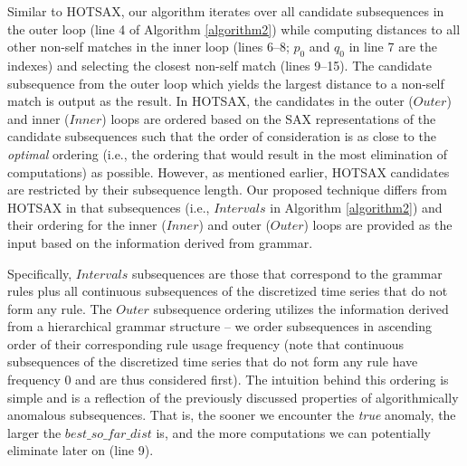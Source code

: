 \documentclass{sig-alternate}
\begin{document}
Similar to HOTSAX, our algorithm iterates over all candidate subsequences in the outer loop (line 4 of Algorithm \ref{algorithm2}) while computing distances to all other non-self matches in the inner loop (lines 6--8; $p_{0}$ and $q_{0}$ in line 7 are the indexes) and selecting the closest non-self match (lines 9--15). The candidate subsequence from the outer loop which yields the largest distance to a non-self match is output as the result. In HOTSAX, the candidates in the outer ($Outer$) and inner ($Inner$) loops are ordered based on the SAX representations of the candidate subsequences such that the order of consideration is as close to the \textit{optimal} ordering (i.e., the ordering that would result in the most elimination of computations) as possible. However, as mentioned earlier, HOTSAX candidates are restricted by their subsequence length. Our proposed technique differs from HOTSAX in that subsequences (i.e., $Intervals$ in Algorithm \ref{algorithm2}) and their ordering for the inner ($Inner$) and outer ($Outer$) loops are provided as the input based on the information derived from grammar.

Specifically, $Intervals$ subsequences are those that correspond to the grammar rules plus all continuous subsequences of the discretized time series that do not form any rule. The $Outer$ subsequence ordering utilizes the information derived from a hierarchical grammar structure -- we order subsequences in  ascending order of their corresponding rule usage frequency (note that continuous subsequences of the discretized time series that do not form any rule have frequency 0 and are thus considered first). The intuition  behind this ordering is simple and is a reflection of the previously discussed properties of algorithmically anomalous subsequences. That is, the sooner we encounter the \textit{true} anomaly, the larger the $best\_so\_far\_dist$ is, and the more computations we can potentially eliminate later on (line 9). 
\end{document}
